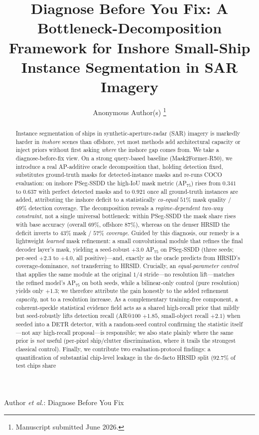\documentclass[journal]{IEEEtran}
\begin{document}
\title{Diagnose Before You Fix: A Bottleneck-Decomposition Framework for Inshore Small-Ship Instance Segmentation in SAR Imagery}

\author{Anonymous Author(s)%
\thanks{Manuscript submitted June 2026.}}

%
{Author \MakeLowercase{\textit{et al.}}: Diagnose Before You Fix}

\maketitle

\begin{abstract}
Instance segmentation of ships in synthetic-aperture-radar (SAR) imagery is markedly harder in \emph{inshore} scenes than offshore, yet most methods add architectural capacity or inject priors without first asking \emph{where} the inshore gap comes from. We take a diagnose-before-fix view. On a strong query-based baseline (Mask2Former-R50), we introduce a real AP-additive oracle decomposition that, holding detection fixed, substitutes ground-truth masks for detected-instance masks and re-runs COCO evaluation: on inshore PSeg-SSDD the high-IoU mask metric (AP$_{75}$) rises from $0.341$ to $0.637$ with perfect detected masks and to $0.921$ once all ground-truth instances are added, attributing the inshore deficit to a statistically \emph{co-equal} $51\%$ mask quality / $49\%$ detection coverage. The decomposition reveals a \emph{regime-dependent two-way constraint}, not a single universal bottleneck: within PSeg-SSDD the mask share rises with base accuracy (overall $69\%$, offshore $87\%$), whereas on the denser HRSID the deficit inverts to $43\%$ mask / $57\%$ \emph{coverage}. Guided by this diagnosis, our remedy is a lightweight \emph{learned} mask refinement: a small convolutional module that refines the final decoder layer's mask, yielding a seed-robust $+3.0$ AP$_{75}$ on PSeg-SSDD (three seeds; per-seed $+2.3$ to $+4.0$, all positive)---and, exactly as the oracle predicts from HRSID's coverage-dominance, \emph{not} transferring to HRSID. Crucially, an \emph{equal-parameter control} that applies the same module at the original $1/4$ stride---no resolution lift---matches the refined model's AP$_{75}$ on both seeds, while a bilinear-only control (pure resolution) yields only $+1.3$; we therefore attribute the gain honestly to the added refinement \emph{capacity}, not to a resolution increase. As a complementary training-free component, a coherent-speckle statistical evidence field acts as a shared high-recall prior that mildly but seed-robustly lifts detection recall (AR@$100$ $+1.85$, small-object recall $+2.1$) when seeded into a DETR detector, with a random-seed control confirming the statistic itself---not any high-recall proposal---is responsible; we also state plainly where the same prior is \emph{not} useful (per-pixel ship/clutter discrimination, where it trails the strongest classical control). Finally, we contribute two evaluation-protocol findings: a quantification of substantial chip-level leakage in the de-facto HRSID split ($92.7\%$ of test chips share 
\end{abstract}
\end{document}
